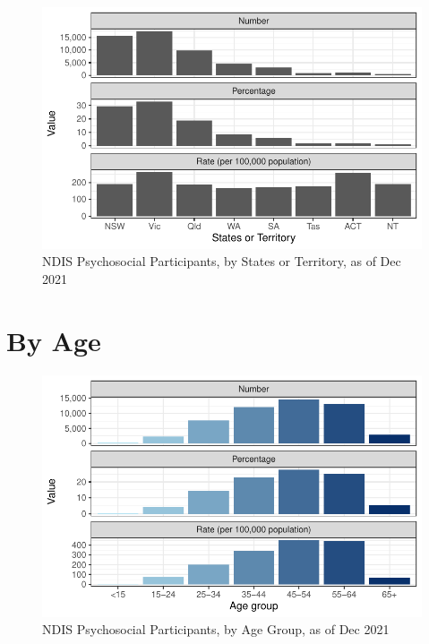 \documentclass[
  a4paper,
  DIV=11,
  numbers=noendperiod]{scrreport}
\begin{document}
\begin{figure}

\caption{\label{fig-dis-s}NDIS Psychosocial Participants, by States or
Territory, as of Dec 2021}

{\centering \includegraphics{./chap5-dis_files/figure-pdf/fig-dis-s-1.pdf}

}

\end{figure}

\hypertarget{by-age}{%
\section{By Age}\label{by-age}}

\begin{figure}

\caption{\label{fig-dis-a}NDIS Psychosocial Participants, by Age Group,
as of Dec 2021}

{\centering \includegraphics{./chap5-dis_files/figure-pdf/fig-dis-a-1.pdf}

}

\end{figure}
\end{document}
